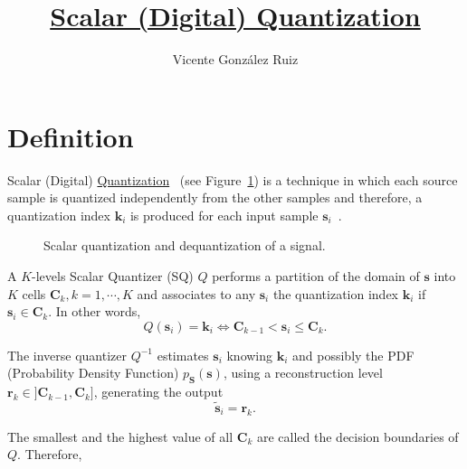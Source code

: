 
\title{\href{https://github.com/vicente-gonzalez-ruiz/scalar_quantization}{Scalar (Digital) Quantization}}

\author{Vicente González Ruiz}

\maketitle
\tableofcontents

\section{Definition}

Scalar (Digital)
\href{https://en.wikipedia.org/wiki/Quantization_(signal_processing)}{Quantization}~\cite{sayood2017introduction,vetterli2014foundations}
(see Figure~\ref{fig:Q}) is a technique in which each source sample is
quantized independently from the other samples and therefore, a
quantization index ${\mathbf k}_i$ is produced for each input sample
${\mathbf s}_i$~\cite{vruiz__signal_quantization}.

\begin{figure}
  \caption{Scalar quantization and dequantization of a signal.}
  \label{fig:Q}
\end{figure}

A $K$-levels Scalar Quantizer (SQ) $Q$ performs a partition of the
domain of ${\mathbf s}$ into $K$ cells ${\mathbf C}_k, k = 1, \cdots,
K$ and associates to any ${\mathbf s}_i$ the quantization index ${\mathbf k}_i$ if
${\mathbf s}_i\in {\mathbf C}_k$. In other words,
\begin{equation}
  Q({\mathbf s}_i) = {\mathbf k}_i \Leftrightarrow {\mathbf C}_{k-1} <
  {\mathbf s}_i \le {\mathbf C}_k.
\end{equation}

The inverse quantizer $Q^{-1}$ estimates ${\mathbf s}_i$ knowing
${\mathbf k}_i$ and possibly the PDF (Probability Density Function)
$p_{\mathbf S}({\mathbf s})$, using a reconstruction level ${\mathbf
  r}_k\in ]{\mathbf C}_{k-1}, {\mathbf C}_k]$, generating the output
\begin{equation}
  \tilde{\mathbf s}_i = {\mathbf r}_k.
\end{equation}

The smallest and the highest value of all ${\mathbf C}_k$ are called
the decision boundaries of $Q$. Therefore,

